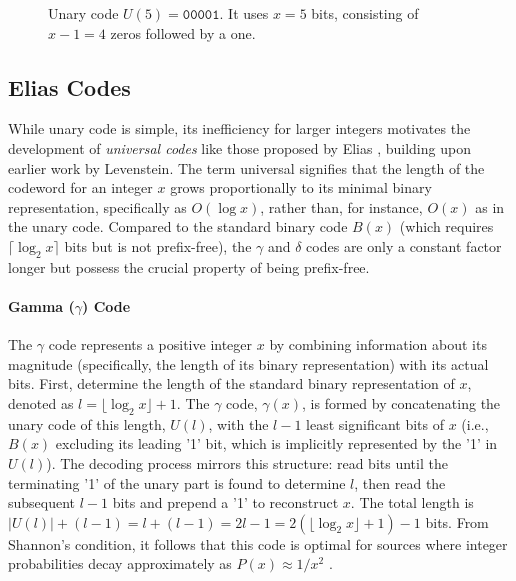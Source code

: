 \begin{figure}[hbtp]
    \centering
    \caption{Unary code $U(5) = \texttt{00001}$. It uses $x=5$ bits, consisting of $x-1=4$ zeros followed by a one.}
    \label{fig:unary_code_example}
\end{figure}



\subsection{Elias Codes}
While unary code is simple, its inefficiency for larger integers motivates the development of \emph{universal codes} like those proposed by Elias \cite{Elias1975}, building upon earlier work by Levenstein. The term universal signifies that the length of the codeword for an integer $x$ grows proportionally to its minimal binary representation, specifically as $O(\log x)$, rather than, for instance, $O(x)$ as in the unary code. Compared to the standard binary code $B(x)$ (which requires $\lceil\log_2 x \rceil$ bits but is not prefix-free), the $\gamma$ and $\delta$ codes are only a constant factor longer but possess the crucial property of being prefix-free.

\paragraph{Gamma ($\gamma$) Code} The $\gamma$ code represents a positive integer $x$ by combining information about its magnitude (specifically, the length of its binary representation) with its actual bits. First, determine the length of the standard binary representation of $x$, denoted as $l = \lfloor \log_2 x \rfloor + 1$. The $\gamma$ code, $\gamma(x)$, is formed by concatenating the unary code of this length, $U(l)$, with the $l-1$ least significant bits of $x$ (i.e., $B(x)$ excluding its leading '1' bit, which is implicitly represented by the '1' in $U(l)$).
The decoding process mirrors this structure: read bits until the terminating '1' of the unary part is found to determine $l$, then read the subsequent $l-1$ bits and prepend a '1' to reconstruct $x$. The total length is $|U(l)| + (l-1) = l + (l-1) = 2l-1 = 2(\lfloor \log_2 x \rfloor + 1) - 1$ bits. From Shannon's condition, it follows that this code is optimal for sources where integer probabilities decay approximately as $P(x) \approx 1/x^2$ \cite{ferragina2023pearls}.

